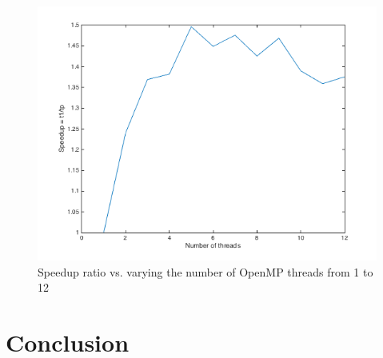 \documentclass[11pt]{article}
\begin{document}
\begin{figure}[H]
	\begin{center}
		\includegraphics[width=12cm]{speedupstrong}
		\caption{Speedup ratio vs. varying the number of OpenMP threads from 1 to 12 }
		\label{fig:speedupstrong}
	\end{center}
\end{figure}

\section{Conclusion}\label{sec:conclusion}
\end{document}
